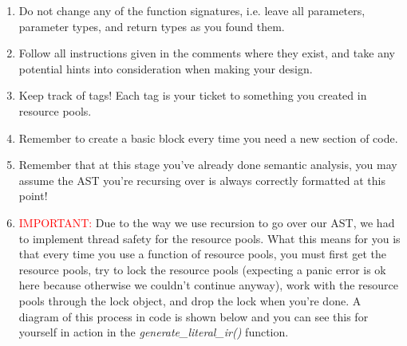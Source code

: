 \documentclass[
	12pt, %
]{fphw}
\begin{document}
\begin{problem}
    \begin{enumerate}
        \item Do not change any of the function signatures, i.e. leave all parameters, parameter types, and return types as you found them.
        \item Follow all instructions given in the comments where they exist, and take any potential hints into consideration when making your design.
        \item Keep track of tags! Each tag is your ticket to something you created in resource pools.
        \item Remember to create a basic block every time you need a new section of code.
        \item Remember that at this stage you've already done semantic analysis, you may assume the AST you're recursing over is always correctly formatted at this point!
        \item \textcolor{red}{IMPORTANT:} Due to the way we use recursion to go over our AST, we had to implement thread safety for the resource pools. What this means for you is that every time you use a function of resource pools, you must first get the resource pools, try to lock the resource pools (expecting a panic error is ok here because otherwise we couldn't continue anyway), work with the resource pools through the lock object, and drop the lock when you're done. A diagram of this process in code is shown below and you can see this for yourself in action in the \textit{generate\_literal\_ir()} function.

        
    \end{enumerate}
\end{problem}

\pagebreak
\end{document}
